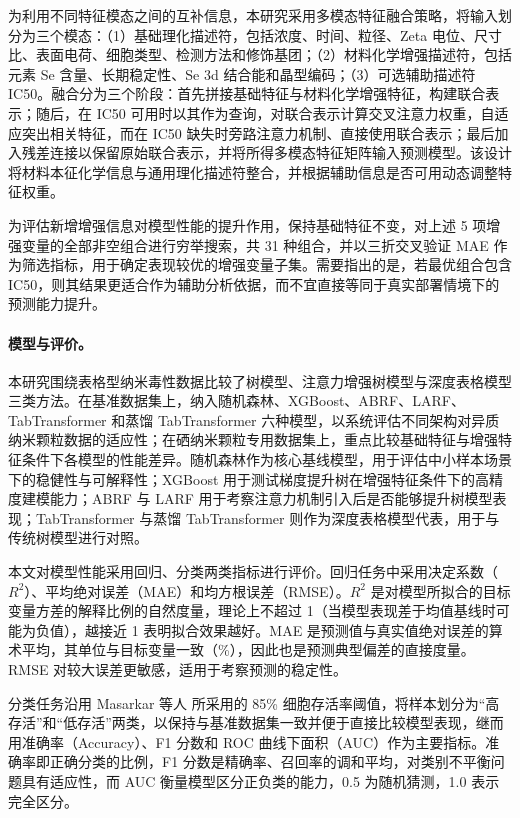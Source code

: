 \documentclass[letterpaper]{article}
\begin{document}
为利用不同特征模态之间的互补信息，本研究采用多模态特征融合策略，将输入划分为三个模态：（1）基础理化描述符，包括浓度、时间、粒径、Zeta 电位、尺寸比、表面电荷、细胞类型、检测方法和修饰基团；（2）材料化学增强描述符，包括元素 Se 含量、长期稳定性、Se 3d 结合能和晶型编码；（3）可选辅助描述符 IC50。融合分为三个阶段：首先拼接基础特征与材料化学增强特征，构建联合表示；随后，在 IC50 可用时以其作为查询，对联合表示计算交叉注意力权重，自适应突出相关特征，而在 IC50 缺失时旁路注意力机制、直接使用联合表示；最后加入残差连接以保留原始联合表示，并将所得多模态特征矩阵输入预测模型。该设计将材料本征化学信息与通用理化描述符整合，并根据辅助信息是否可用动态调整特征权重。

为评估新增增强信息对模型性能的提升作用，保持基础特征不变，对上述 5 项增强变量的全部非空组合进行穷举搜索，共 31 种组合，并以三折交叉验证 MAE 作为筛选指标，用于确定表现较优的增强变量子集。需要指出的是，若最优组合包含 IC50，则其结果更适合作为辅助分析依据，而不宜直接等同于真实部署情境下的预测能力提升。

\paragraph{模型与评价。}
本研究围绕表格型纳米毒性数据比较了树模型、注意力增强树模型与深度表格模型三类方法。在基准数据集上，纳入随机森林、XGBoost、ABRF、LARF、TabTransformer 和蒸馏 TabTransformer 六种模型，以系统评估不同架构对异质纳米颗粒数据的适应性；在硒纳米颗粒专用数据集上，重点比较基础特征与增强特征条件下各模型的性能差异。随机森林作为核心基线模型，用于评估中小样本场景下的稳健性与可解释性；XGBoost 用于测试梯度提升树在增强特征条件下的高精度建模能力；ABRF 与 LARF 用于考察注意力机制引入后是否能够提升树模型表现；TabTransformer 与蒸馏 TabTransformer 则作为深度表格模型代表，用于与传统树模型进行对照。

本文对模型性能采用回归、分类两类指标进行评价。回归任务中采用决定系数（\(R^2\)）、平均绝对误差（MAE）和均方根误差（RMSE）。\(R^2\) 是对模型所拟合的目标变量方差的解释比例的自然度量，理论上不超过 1（当模型表现差于均值基线时可能为负值），越接近 1 表明拟合效果越好。MAE 是预测值与真实值绝对误差的算术平均，其单位与目标变量一致（\%），因此也是预测典型偏差的直接度量。RMSE 对较大误差更敏感，适用于考察预测的稳定性。

分类任务沿用 Masarkar 等人\cite{masarkar2024} 所采用的 85\% 细胞存活率阈值，将样本划分为“高存活”和“低存活”两类，以保持与基准数据集一致并便于直接比较模型表现，继而用准确率（Accuracy）、F1 分数和 ROC 曲线下面积（AUC）作为主要指标。准确率即正确分类的比例，F1 分数是精确率、召回率的调和平均，对类别不平衡问题具有适应性，而 AUC 衡量模型区分正负类的能力，0.5 为随机猜测，1.0 表示完全区分。
\end{document}
